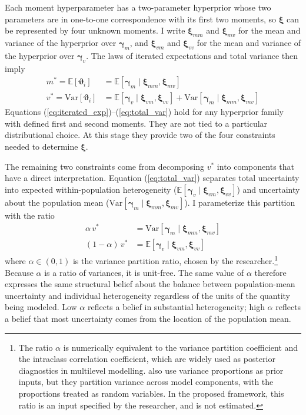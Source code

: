 \documentclass[12pt,a4paper]{article}
\theoremstyle{definition}
\theoremstyle{remark}
\newcommand{\E}[1]{\mathbb{E}\left[#1\right]}
\newcommand{\Var}[1]{\text{Var}\left[#1\right]}
\newcommand{\bv}{\boldsymbol{\vartheta}}
\newcommand{\hypem}{\boldsymbol{\gamma}_m}
\newcommand{\hypev}{\boldsymbol{\gamma}_v}
\newcommand{\dpv}{v^*}
\newcommand{\hprior}{\boldsymbol{\xi}}
\newcommand{\hpriormm}{\boldsymbol{\xi}_{mm}}
\newcommand{\hpriormv}{\boldsymbol{\xi}_{mv}}
\newcommand{\hpriorvm}{\boldsymbol{\xi}_{vm}}
\newcommand{\hpriorvv}{\boldsymbol{\xi}_{vv}}
\newcommand{\Ehpm}[1]{\E{#1 \mid \hpriormm, \hpriormv}}
\newcommand{\Varhpm}[1]{\Var{#1 \mid \hpriormm, \hpriormv}}
\newcommand{\Ehpv}[1]{\E{#1 \mid \hpriorvm, \hpriorvv}}
\begin{document}
Each moment hyperparameter has a two-parameter hyperprior whose two
parameters are in one-to-one correspondence with its first two moments, so
$\hprior$ can be represented by four unknown moments. I write $\hpriormm$ and
$\hpriormv$ for the mean and variance of the hyperprior over $\hypem$, and
$\hpriorvm$ and $\hpriorvv$ for the mean and variance of the hyperprior over
$\hypev$. The laws of iterated expectations and total variance then imply
\begin{align}
  \label{eq:iterated_exp}
  m^* = \E{\bv_i} &= \Ehpm{\hypem{}} \\
  \label{eq:total_var}
  v^* = \Var{\bv_i} &= \Ehpv{\hypev{}} + \Varhpm{\hypem{}}
\end{align}
Equations (\ref{eq:iterated_exp})--(\ref{eq:total_var}) hold for any
hyperprior family with defined first and second moments. They are not tied to a
particular distributional choice. At this stage they provide two of the four
constraints needed to determine $\hprior{}$.

The remaining two constraints come from decomposing $\dpv$ into components that
have a direct interpretation. Equation (\ref{eq:total_var}) separates total
uncertainty into expected within-population heterogeneity
($\Ehpv{\hypev{}}$) and uncertainty about the population mean
($\Varhpm{\hypem{}}$). I parameterize this partition with the ratio
\begin{align}
  \label{eq:alpha_def}
  \alpha \, v^* &= \Varhpm{\hypem{}} \\
  \label{eq:one_minus_alpha}
  (1 - \alpha) \, v^* &= \Ehpv{\hypev{}}
\end{align}
where $\alpha \in (0, 1)$ is the variance partition ratio, chosen by the
researcher.\footnote{
  The ratio $\alpha$ is numerically equivalent to the variance partition
  coefficient \parencite{Goldstein2002} and the intraclass correlation
  coefficient, which are widely used as posterior diagnostics in multilevel
  modelling. \textcite{Fuglstad2020} also use variance proportions as prior
  inputs, but they partition variance across model components, with the
  proportions treated as random variables. In the proposed framework, this
  ratio is an input specified by the researcher, and is not estimated.
} Because $\alpha$ is a ratio of variances, it is unit-free. The same value of
$\alpha$ therefore expresses the same structural belief about the balance between
population-mean uncertainty and individual heterogeneity regardless of the
units of the quantity being modeled. Low $\alpha$ reflects a belief in
substantial heterogeneity; high $\alpha$ reflects a belief that most uncertainty
comes from the location of the population mean.
\end{document}
